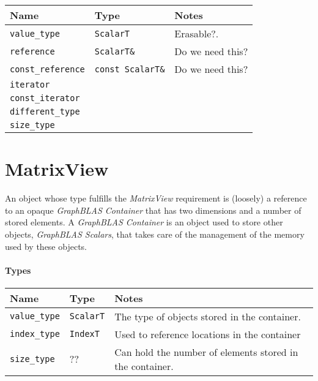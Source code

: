 \begin{tabularx}{\textwidth}{l l X}
\textbf{Name} & \textbf{Type} & \textbf{Notes}\\
\hline
\texttt{value\_type} & \texttt{ScalarT}  & Erasable?.\\ \hline
\texttt{reference}  & \texttt{ScalarT\&} & Do we need this? \\ \hline
\texttt{const\_reference}  & \texttt{const ScalarT\&} & Do we need this? \\ \hline
\texttt{iterator}  & & \\ \hline
\texttt{const\_iterator}  & & \\ \hline
\texttt{different\_type}  & & \\ \hline
\texttt{size\_type}  & &
\end{tabularx}

\section{MatrixView}
An object whose type fulfills the \textit{MatrixView} requirement is (loosely) a 
reference to an opaque \textit{GraphBLAS Container} that has two dimensions and a 
number of stored elements.  A \textit{GraphBLAS Container} is an object used to store
other objects, \textit{GraphBLAS Scalars}, that takes care of the management of the
memory used by these objects. 



\paragraph{Types}

\begin{tabularx}{\textwidth}{l l X}
\textbf{Name} & \textbf{Type} & \textbf{Notes}\\
\hline
\texttt{value\_type} & \texttt{ScalarT}  & The type of objects stored in the container.\\ \hline
\texttt{index\_type} & \texttt{IndexT}   & Used to reference locations in the container \\ \hline
\texttt{size\_type}  & ??                & Can hold the number of elements stored in the container.
\end{tabularx}

